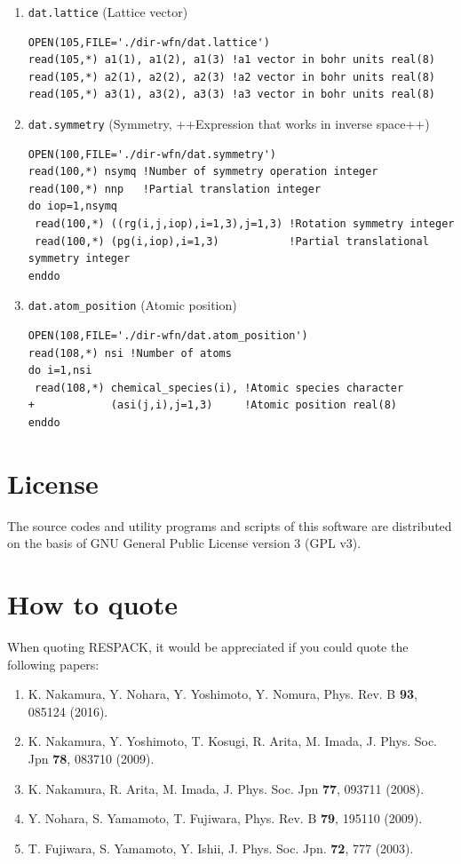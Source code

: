 \documentclass{article}
\begin{document}
\begin{enumerate}
\begin{verbatim}
\end{verbatim}
\item \verb+dat.lattice+ (Lattice vector)
\begin{verbatim}
OPEN(105,FILE='./dir-wfn/dat.lattice') 
read(105,*) a1(1), a1(2), a1(3) !a1 vector in bohr units real(8)
read(105,*) a2(1), a2(2), a2(3) !a2 vector in bohr units real(8) 
read(105,*) a3(1), a3(2), a3(3) !a3 vector in bohr units real(8) 
\end{verbatim}
\item \verb+dat.symmetry+ (Symmetry, ++Expression that works in inverse space++)
\begin{verbatim}
OPEN(100,FILE='./dir-wfn/dat.symmetry') 
read(100,*) nsymq !Number of symmetry operation integer
read(100,*) nnp   !Partial translation integer
do iop=1,nsymq 
 read(100,*) ((rg(i,j,iop),i=1,3),j=1,3) !Rotation symmetry integer
 read(100,*) (pg(i,iop),i=1,3)           !Partial translational symmetry integer 
enddo 
\end{verbatim}
\item {\tt dat.atom\_position} (Atomic position)
\begin{verbatim}
OPEN(108,FILE='./dir-wfn/dat.atom_position')
read(108,*) nsi !Number of atoms
do i=1,nsi
 read(108,*) chemical_species(i), !Atomic species character
+            (asi(j,i),j=1,3)     !Atomic position real(8)
enddo
\end{verbatim}
\end{enumerate}

\clearpage 

\section{\label{license}License} 
The source codes and utility programs and scripts of this software are distributed on the basis of GNU General Public License version 3 (GPL v3).

\section{\label{howtocite}How to quote} 
When quoting RESPACK, it would be appreciated if you could quote the following papers: 
\begin{enumerate} 
\item K. Nakamura, Y. Nohara, Y. Yoshimoto, Y. Nomura, Phys. Rev. B {\bf 93}, 085124 (2016).
\item K. Nakamura, Y. Yoshimoto, T. Kosugi, R. Arita, M. Imada, J. Phys. Soc. Jpn {\bf 78}, 083710 (2009).
\item K. Nakamura, R. Arita, M. Imada, J. Phys. Soc. Jpn {\bf 77}, 093711 (2008).
\item Y. Nohara, S. Yamamoto, T. Fujiwara, Phys. Rev. B {\bf 79}, 195110 (2009).
\item T. Fujiwara, S. Yamamoto, Y. Ishii, J. Phys. Soc. Jpn. {\bf 72}, 777 (2003).
\end{enumerate} 
\end{document}
